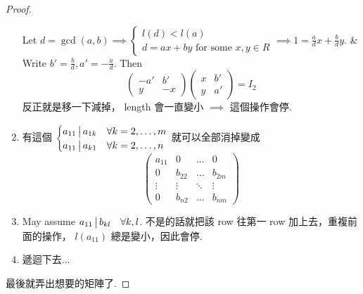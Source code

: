 \begin{theorem}
\begin{proof}
\begin{enumerate}
        Let $d = \gcd(a, b) \implies \begin{cases}
          l(d) < l(a) \\
          d = ax + by \text{~for some~} x, y \in R
        \end{cases} \implies 1 = \frac{a}{d}x + \frac{b}{d}y$.
        &
        Write $b' = \frac{b}{d}, a' = -\frac{a}{d}$.
        Then
        \[
          \begin{pmatrix} -a' & b' \\ y & -x \end{pmatrix}
          \begin{pmatrix} x & b' \\ y & a' \end{pmatrix}
          = I_2
        \]
        反正就是移一下減掉， length 會一直變小 $\implies$ 這個操作會停.
      \item 有這個 $\begin{cases}
          a_{11} \,\big|\, a_{1k} & \forall k = 2, \dots, m \\
          a_{11} \,\big|\, a_{k1} & \forall k = 2, \dots, n
        \end{cases}$ 就可以全部消掉變成
        \[
          \begin{pmatrix}
            a_{11} & 0 & \dots & 0 \\
            0 & b_{22} & \dots & b_{2m}\\
            \vdots & \vdots & \ddots & \vdots \\
            0 & b_{n2} & \dots & b_{nm}
          \end{pmatrix}
        \]
      \item May assume $a_{11} \,\big|\, b_{kl} \quad \forall k, l$.
        不是的話就把該 row 往第一 row 加上去，重複前面的操作，
        $l(a_{11})$ 總是變小，因此會停.
      \item 遞迴下去...
    \end{enumerate}
    最後就弄出想要的矩陣了.
  \end{proof}
\end{theorem}


